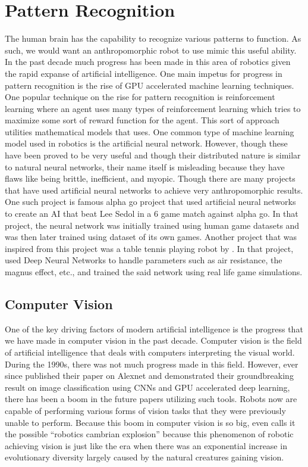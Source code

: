 \documentclass[conference]{IEEEtran}
\begin{document}
\section{Pattern Recognition}
The human brain has the capability to recognize various patterns to function. As such, we would want an anthropomorphic robot to use mimic this useful ability. In the past decade much progress has been made in this area of robotics given the rapid expanse of artificial intelligence. One main impetus for progress in pattern recognition is the rise of GPU accelerated machine learning techniques. One popular technique on the rise for pattern recognition is reinforcement learning where an agent uses many types of reinforcement learning which tries to maximize some sort of reward function for the agent. This sort of approach utilities mathematical models that uses. One common type of machine learning model used in robotics is the artificial neural network. However, though these have been proved to be very useful and though their distributed nature is similar to natural neural networks, their name itself is misleading because they have flaws like being brittle, inefficient, and myopic\autocite{Watson2019}. Though there are many projects that have used artificial neural networks to achieve very anthropomorphic results. One such project is famous alpha go project that used artificial neural networks to create an AI that beat Lee Sedol in a 6 game match against alpha go\autocite{silver2017mastering}. In that project, the neural network was initially trained using human game datasets and was then later trained using dataset of its own games\autocite{silver2017mastering}. Another project that was inspired from this project was a table tennis playing robot by \textcite{lin2020}. In that project, \textcite{lin2020} used Deep Neural Networks to handle parameters such as air resistance, the magnus effect, etc., and trained the said network using real life game simulations.

\subsection{Computer Vision}
One of the key driving factors of modern artificial intelligence is the progress that we have made in computer vision in the past decade. Computer vision is the field of artificial intelligence that deals with computers interpreting the visual world. During the 1990s, there was not much progress made in this field. However, ever since \textcite{krizhevsky2012imagenet} published their paper on Alexnet and demonstrated their groundbreaking result on image classification using CNNs and GPU accelerated deep learning, there has been a boom in the future papers utilizing such tools. Robots now are capable of performing various forms of vision tasks that they were previously unable to perform. Because this boom in computer vision is so big, \textcite{pratt2015cambrian} even calls it the possible ``robotics cambrian explosion'' because this phenomenon of robotic achieving vision is just like the era when there was an exponential increase in evolutionary diversity largely caused by the natural creatures gaining vision. 
\end{document}
